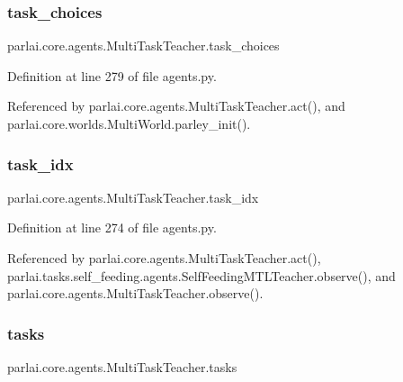 \subsubsection{\texorpdfstring{task\+\_\+choices}{task\_choices}}
{\footnotesize\ttfamily parlai.\+core.\+agents.\+Multi\+Task\+Teacher.\+task\+\_\+choices}



Definition at line 279 of file agents.\+py.



Referenced by parlai.\+core.\+agents.\+Multi\+Task\+Teacher.\+act(), and parlai.\+core.\+worlds.\+Multi\+World.\+parley\+\_\+init().

\mbox{\label{classparlai_1_1core_1_1agents_1_1MultiTaskTeacher_aff3455bc2af79f632214a4de2bad3d11}} 
\subsubsection{\texorpdfstring{task\+\_\+idx}{task\_idx}}
{\footnotesize\ttfamily parlai.\+core.\+agents.\+Multi\+Task\+Teacher.\+task\+\_\+idx}



Definition at line 274 of file agents.\+py.



Referenced by parlai.\+core.\+agents.\+Multi\+Task\+Teacher.\+act(), parlai.\+tasks.\+self\+\_\+feeding.\+agents.\+Self\+Feeding\+M\+T\+L\+Teacher.\+observe(), and parlai.\+core.\+agents.\+Multi\+Task\+Teacher.\+observe().

\mbox{\label{classparlai_1_1core_1_1agents_1_1MultiTaskTeacher_a5d284137aebeea42719984d60d3d72f6}} 
\subsubsection{\texorpdfstring{tasks}{tasks}}
{\footnotesize\ttfamily parlai.\+core.\+agents.\+Multi\+Task\+Teacher.\+tasks}



